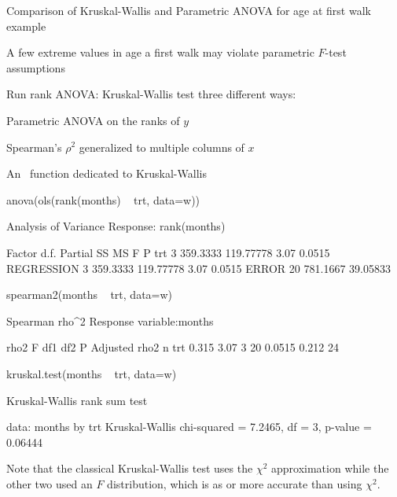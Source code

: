 \item Comparison of Kruskal-Wallis and Parametric ANOVA for age at
  first walk example 
 \bi
 \item A few extreme values in age a first walk may violate parametric
   $F$-test assumptions
 \item Run rank ANOVA: Kruskal-Wallis test three different ways:
   \bi
   \item Parametric ANOVA on the ranks of $y$
   \item Spearman's $\rho^2$ generalized to multiple columns of $x$
   \item An \R\ function dedicated to Kruskal-Wallis
   \ei
 \ei
\ei
\begin{Schunk}
\begin{Sinput}
anova(ols(rank(months) ~ trt, data=w))
\end{Sinput}
\begin{Soutput}
                Analysis of Variance          Response: rank(months) 

 Factor     d.f. Partial SS MS        F    P     
 trt         3   359.3333   119.77778 3.07 0.0515
 REGRESSION  3   359.3333   119.77778 3.07 0.0515
 ERROR      20   781.1667    39.05833            
\end{Soutput}
\begin{Sinput}
spearman2(months ~ trt, data=w)
\end{Sinput}
\begin{Soutput}

Spearman rho^2    Response variable:months

     rho2    F df1 df2      P Adjusted rho2  n
trt 0.315 3.07   3  20 0.0515         0.212 24
\end{Soutput}
\begin{Sinput}
kruskal.test(months ~ trt, data=w)
\end{Sinput}
\begin{Soutput}

	Kruskal-Wallis rank sum test

data:  months by trt
Kruskal-Wallis chi-squared = 7.2465, df = 3, p-value = 0.06444
\end{Soutput}
\end{Schunk}
Note that the classical Kruskal-Wallis test uses the $\chi^{2}$
approximation while the other two used an $F$ distribution, which is
as or more accurate than using $\chi^{2}$.

